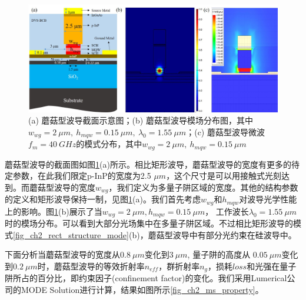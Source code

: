 \begin{figure}[htb]
	\centering
	\includegraphics[width=16cm]{./Pictures/fig_ch2_ms_structure_mode.jpg}
	\caption{(a) 蘑菇型波导截面示意图；(b) 蘑菇型波导模场分布图，其中$w_{wg} = 2~ \mu m,~h_{mqw} = 0.15 ~\mu m,~\lambda_0 = 1.55~\mu m$；(c) 蘑菇型波导微波$f_m = 40~GHz$的模式分布，其中$w_{wg} = 2~\mu m,~h_{mqw} = 0.15~\mu m$}
	\label{fig_ch2_ms_structure_mode}
\end{figure}


蘑菇型波导的截面图如图\ref{fig_ch2_ms_structure_mode}(a)所示。相比矩形波导，蘑菇型波导的宽度有更多的待定参数，在此我们限定p-InP的宽度为2.5 $\mu m$，这个尺寸是可以用接触式光刻达到。而蘑菇型波导的宽度$w_{wg}$，我们定义为多量子阱区域的宽度。其他的结构参数的定义和矩形波导保持一制，见图\ref{fig_ch2_ms_structure_mode}(a)。我们首先考虑$w_{wg}$和$h_{mqw}$对波导光学性能上的影响。图\ref{fig_ch2_ms_structure_mode}(b)展示了当$w_{wg} = 2 ~\mu m, h_{mqw} = 0.15 ~\mu m$， 工作波长$\lambda_0 = 1.55~\mu m$时的模场分布。可以看到大部分光场集中在多量子阱区域。不过相比矩形波导的模式\ref{fig_ch2_rect_structure_mode}(b)，蘑菇型波导中有部分光约束在硅波导中。

下面分析当蘑菇型波导的宽度从$0.8 ~\mu m$变化到$3~\mu m$, 量子阱的高度从 $0.05 ~\mu m$变化到$0.2 ~\mu m$时，蘑菇型波导的等效折射率$n_{eff}$，群折射率$n_g$，损耗$loss$和光强在量子阱所占的百分比，即约束因子(confinement factor)的变化。我们采用Lumerical公司的MODE Solution进行计算\cite{modesolution}，结果如图所示\ref{fig_ch2_ms_property}。

